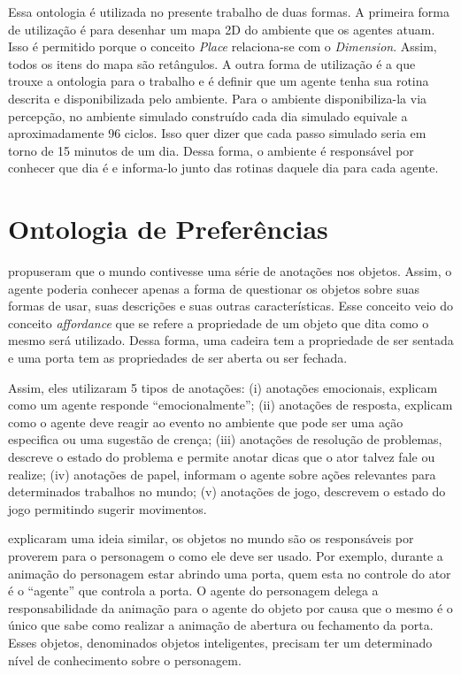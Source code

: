 Essa ontologia é utilizada no presente trabalho de duas formas. A primeira
forma de utilização é para desenhar um mapa 2D do ambiente que os agentes
atuam. Isso é permitido porque o conceito \emph{Place} relaciona-se com o
\emph{Dimension}. Assim, todos os itens do mapa são retângulos. A outra forma
de utilização é a que trouxe a ontologia para o trabalho e é definir que um
agente tenha sua rotina descrita e disponibilizada pelo ambiente. Para o
ambiente disponibiliza-la via percepção, no ambiente simulado construído cada
dia simulado equivale a aproximadamente 96 ciclos. Isso quer dizer que cada
passo simulado seria em torno de 15 minutos de um dia. Dessa forma, o ambiente
é responsável por conhecer que dia é e informa-lo junto das rotinas daquele
dia para cada agente.

\section{Ontologia de Preferências} \label{ch:aec:oda}

\citet{doyle1998annotated} propuseram que o mundo contivesse uma série de
anotações nos objetos. Assim, o agente poderia conhecer apenas a forma de
questionar os objetos sobre suas formas de usar, suas descrições e suas outras
características. Esse conceito veio do conceito \emph{affordance} que se
refere a propriedade de um objeto que dita como o mesmo será utilizado.
Dessa forma, uma cadeira tem a propriedade de ser sentada e uma porta tem as
propriedades de ser aberta ou ser fechada.

Assim, eles utilizaram 5 tipos de anotações: (i) anotações emocionais,
explicam como um agente responde ``emocionalmente''; (ii) anotações de
resposta, explicam como o agente deve reagir ao evento no ambiente que pode ser
uma ação especifica ou uma sugestão de crença; (iii) anotações de resolução de
problemas, descreve o estado do problema e permite anotar dicas que o ator
talvez fale ou realize; (iv) anotações de papel, informam o agente sobre ações
relevantes para determinados trabalhos no mundo; (v) anotações de jogo,
descrevem o estado do jogo permitindo sugerir movimentos.

\citet{kallmann1999modeling} explicaram uma ideia similar, os objetos no mundo
são os responsáveis por proverem para o personagem o como ele deve ser usado.
Por exemplo, durante a animação do personagem estar abrindo uma porta, quem esta
no controle do ator é o ``agente'' que controla a porta. O agente do
personagem delega a responsabilidade da animação para o agente do objeto por
causa que o mesmo é o único que sabe como realizar a animação de abertura ou
fechamento da porta. Esses objetos, denominados objetos inteligentes, precisam
ter um determinado nível de conhecimento sobre o personagem.

